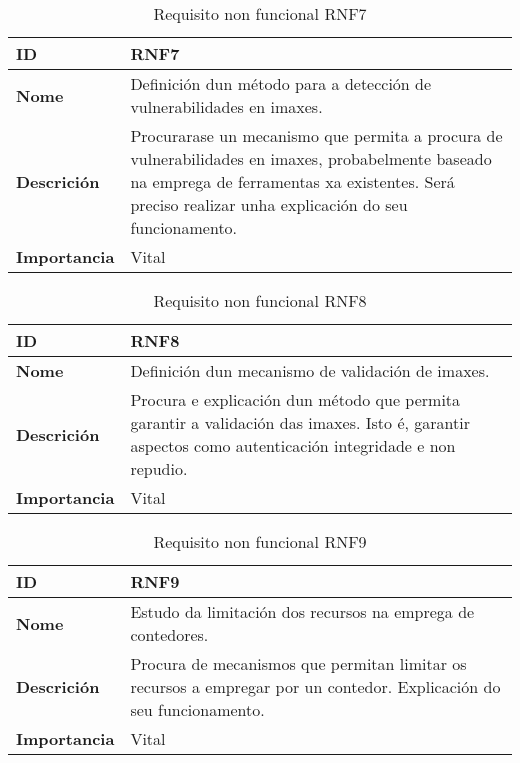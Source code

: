 \begin{table}[H]
\centering
\caption{Requisito non funcional RNF7}
\label{RNF7}
\begin{tabularx}{\textwidth}{|l|X|}
\hline
\textbf{ID} & RNF7 \\ \hline
\textbf{Nome} & Definición dun método para a detección de vulnerabilidades en imaxes. \\ \hline
\textbf{Descrición} & Procurarase un mecanismo que permita a procura de vulnerabilidades en imaxes, probabelmente baseado na emprega de ferramentas xa existentes. Será preciso realizar unha explicación do seu funcionamento. \\ \hline
\textbf{Importancia} & Vital \\ \hline
\end{tabularx}
\end{table}

\begin{table}[H]
\centering
\caption{Requisito non funcional RNF8}
\label{RNF8}
\begin{tabularx}{\textwidth}{|l|X|}
\hline
\textbf{ID} & RNF8 \\ \hline
\textbf{Nome} & Definición dun mecanismo de validación de imaxes. \\ \hline
\textbf{Descrición} & Procura e explicación dun método que permita garantir a validación das imaxes. Isto é, garantir aspectos como autenticación integridade e non repudio. \\ \hline
\textbf{Importancia} & Vital \\ \hline
\end{tabularx}
\end{table}

\begin{table}[H]
\centering
\caption{Requisito non funcional RNF9}
\label{RNF9}
\begin{tabularx}{\textwidth}{|l|X|}
\hline
\textbf{ID} & RNF9 \\ \hline
\textbf{Nome} & Estudo da limitación dos recursos na emprega de contedores. \\ \hline
\textbf{Descrición} & Procura de mecanismos que permitan limitar os recursos a empregar por un contedor. Explicación do seu funcionamento. \\ \hline
\textbf{Importancia} & Vital \\ \hline
\end{tabularx}
\end{table}

